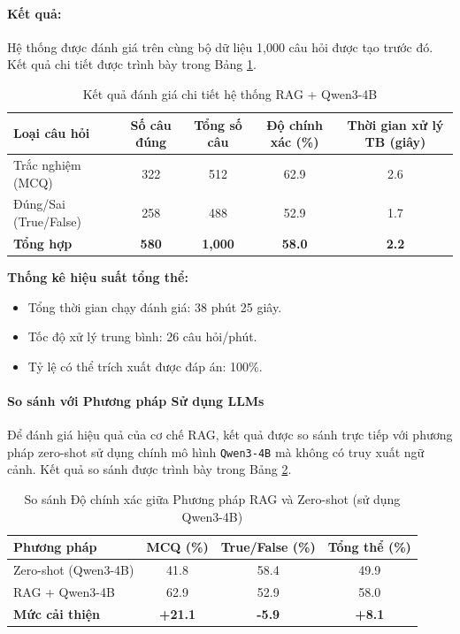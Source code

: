 \paragraph{Kết quả:}
Hệ thống được đánh giá trên cùng bộ dữ liệu 1,000 câu hỏi được tạo trước đó. Kết quả chi tiết được trình bày trong Bảng \ref{tab:rag-results-detail}.

\begin{table}[H]
\centering
\caption{Kết quả đánh giá chi tiết hệ thống RAG + Qwen3-4B}
\label{tab:rag-results-detail}
\begin{tabular}{|l|c|c|c|c|}
\hline
\textbf{Loại câu hỏi} & \textbf{Số câu đúng} & \textbf{Tổng số câu} & \textbf{Độ chính xác (\%)} & \textbf{Thời gian xử lý TB (giây)} \\ \hline
Trắc nghiệm (MCQ) & 322 & 512 & 62.9 & 2.6 \\ \hline
Đúng/Sai (True/False) & 258 & 488 & 52.9 & 1.7 \\ \hline
\textbf{Tổng hợp} & \textbf{580} & \textbf{1,000} & \textbf{58.0} & \textbf{2.2} \\ \hline
\end{tabular}
\end{table}

\noindent\textbf{Thống kê hiệu suất tổng thể:}
\begin{itemize}
    \item Tổng thời gian chạy đánh giá: 38 phút 25 giây.
    \item Tốc độ xử lý trung bình: 26 câu hỏi/phút.
    \item Tỷ lệ có thể trích xuất được đáp án: 100\%.
\end{itemize}

\paragraph{So sánh với Phương pháp Sử dụng LLMs}
Để đánh giá hiệu quả của cơ chế RAG, kết quả được so sánh trực tiếp với phương pháp zero-shot sử dụng chính mô hình \texttt{Qwen3-4B} mà không có truy xuất ngữ cảnh. Kết quả so sánh được trình bày trong Bảng \ref{tab:rag-vs-zeroshot}.

\begin{table}[H]
\centering
\caption{So sánh Độ chính xác giữa Phương pháp RAG và Zero-shot (sử dụng Qwen3-4B)}
\label{tab:rag-vs-zeroshot}
\begin{tabular}{|l|c|c|c|}
\hline
\textbf{Phương pháp} & \textbf{MCQ (\%)} & \textbf{True/False (\%)} & \textbf{Tổng thể (\%)} \\ \hline
Zero-shot (Qwen3-4B) & 41.8 & 58.4 & 49.9 \\ \hline
RAG + Qwen3-4B & 62.9 & 52.9 & 58.0 \\ \hline
\textbf{Mức cải thiện} & \textbf{+21.1} & \textbf{-5.9} & \textbf{+8.1} \\ \hline
\end{tabular}
\end{table}

